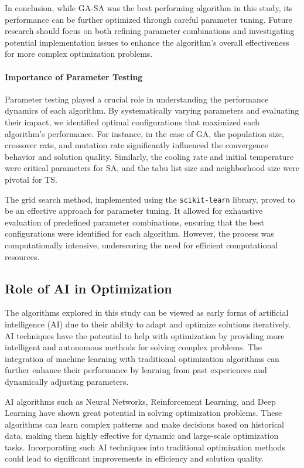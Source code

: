 \documentclass{article}
\begin{document}
    In conclusion, while GA-SA was the best performing algorithm in this study, its performance can be further optimized through careful parameter tuning. Future research should focus on both refining parameter combinations and investigating potential implementation issues to enhance the algorithm’s overall effectiveness for more complex optimization problems.

    \paragraph{Importance of Parameter Testing}
    Parameter testing played a crucial role in understanding the performance dynamics of each algorithm. By systematically varying parameters and evaluating their impact, we identified optimal configurations that maximized each algorithm's performance. For instance, in the case of GA, the population size, crossover rate, and mutation rate significantly influenced the convergence behavior and solution quality. Similarly, the cooling rate and initial temperature were critical parameters for SA, and the tabu list size and neighborhood size were pivotal for TS.

    The grid search method, implemented using the \texttt{scikit-learn} library, proved to be an effective approach for parameter tuning. It allowed for exhaustive evaluation of predefined parameter combinations, ensuring that the best configurations were identified for each algorithm. However, the process was computationally intensive, underscoring the need for efficient computational resources.

    \subsection{Role of AI in Optimization}
    The algorithms explored in this study can be viewed as early forms of artificial intelligence (AI) due to their ability to adapt and optimize solutions iteratively. AI techniques have the potential to help with optimization by providing more intelligent and autonomous methods for solving complex problems. The integration of machine learning with traditional optimization algorithms can further enhance their performance by learning from past experiences and dynamically adjusting parameters.

    AI algorithms such as Neural Networks, Reinforcement Learning, and Deep Learning have shown great potential in solving optimization problems. These algorithms can learn complex patterns and make decisions based on historical data, making them highly effective for dynamic and large-scale optimization tasks. Incorporating such AI techniques into traditional optimization methods could lead to significant improvements in efficiency and solution quality.
\end{document}
